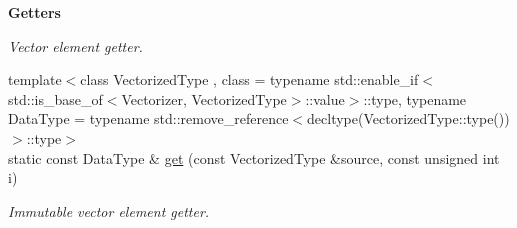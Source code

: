 \begin{Indent}{\bf Getters}
\begin{DoxyCompactItemize}
\begin{DoxyCompactList}\small\item\em Vector element getter. \end{DoxyCompactList}\item 
{\footnotesize template$<$class Vectorized\-Type , class  = typename std\-::enable\-\_\-if$<$std\-::is\-\_\-base\-\_\-of$<$\-Vectorizer, Vectorized\-Type$>$\-::value$>$\-::type, typename Data\-Type  = typename std\-::remove\-\_\-reference$<$decltype(\-Vectorized\-Type\-::type())$>$\-::type$>$ }\\static const Data\-Type \& \hyperlink{classmagrathea_1_1Vectorizer_a3a3ae98c035c1f3004ee2f88f6179066}{get} (const Vectorized\-Type \&source, const unsigned int i)
\begin{DoxyCompactList}\small\item\em Immutable vector element getter. \end{DoxyCompactList}\end{DoxyCompactItemize}
\end{Indent}
